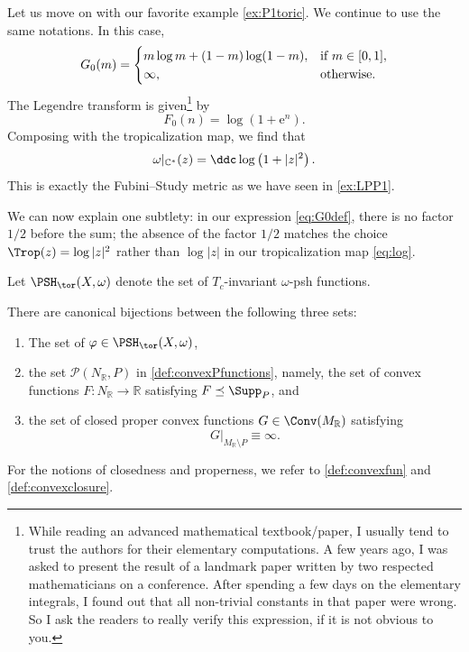 \begin{example}\label{ex:P1toric1}
Let us move on with our favorite example \cref{ex:P1toric}. We continue to use the same notations. In this case,
\[
G_0(m)=
\begin{cases}
    m\log m+(1-m)\log (1-m),& \textup{if } m\in [0,1],\\
    \infty,&\textup{otherwise}.
\end{cases}
\]
The Legendre transform is given\footnote{While reading an advanced mathematical textbook/paper, I usually tend to trust the authors for their elementary computations. A few years ago, I was asked to present the result of a landmark paper written by two respected mathematicians on a conference. After spending a few days on the elementary integrals, I found out that all non-trivial constants in that paper were wrong. So I ask the readers to really verify this expression, if it is not obvious to you.} by
\[
F_0(n)=\log\left(1+\mathrm{e}^n\right).
\]
Composing with the tropicalization map, we find that
\[
\omega|_{\mathbb{C}^*}(z)=\ddc\log\left(1+|z|^2\right).
\]
This is exactly the Fubini--Study metric as we have seen in \cref{ex:LPP1}.

We can now explain one subtlety: in our expression \eqref{eq:G0def}, there is no factor $1/2$ before the sum; the absence of the factor $1/2$ matches the choice $\Trop(z)=\log|z|^2$ rather than $\log|z|$ in our tropicalization map \eqref{eq:log}.
\end{example}


Let $\PSH_{\tor}(X,\omega)$ denote the set of $T_c$-invariant $\omega$-psh functions.
\begin{theorem}\label{thm:toricpsh}
    There are canonical bijections between the following three sets:
    \begin{enumerate}
        \item\label{itm:thm:toricpsh:1} The set of $\varphi\in \PSH_{\tor}(X,\omega)$,
        \item\label{itm:thm:toricpsh:2} the set $\mathcal{P}(N_{\mathbb{R}},P)$ in \cref{def:convexPfunctions}, namely, the set of convex functions $F\colon N_{\mathbb{R}}\rightarrow \mathbb{R}$ satisfying $F\preceq \Supp_P$, and
        \item\label{itm:thm:toricpsh:3} the set of closed proper convex functions $G\in \Conv(M_{\mathbb{R}})$ satisfying
        \[
        G|_{M_{\mathbb{R}}\setminus P}\equiv \infty.
        \]
    \end{enumerate}
\end{theorem}
For the notions of closedness and properness, we refer to \cref{def:convexfun} and \cref{def:convexclosure}.

